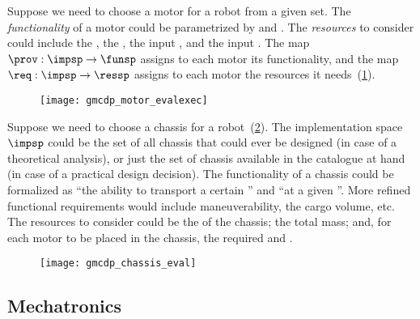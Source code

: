 \begin{example}
    \label{exa:motor}Suppose we need to choose a motor for a robot from
    a given set. The \emph{functionality} of a motor could be parametrized
    by  and . The \emph{resources} to consider
    could include the , the , the
    input , and the input .
    The map~$\prov:\impsp\rightarrow\funsp$ assigns to each motor its
    functionality, and the map~$\req:\impsp\rightarrow\ressp$ assigns
    to each motor the resources it needs~(\cref{fig:motor_evalexec}).
\end{example}

\begin{figure}[h]
    \centering
    \texttt{[image: gmcdp\_motor\_evalexec]}
    \caption{}
    \label{fig:motor_evalexec}
\end{figure}


\begin{example}
    \label{exa:chassis}Suppose we need to choose a chassis for a robot~(\cref{fig:gmcdp_chassis_eval}).
    The implementation space~$\impsp$ could be the set of all chassis
    that could ever be designed (in case of a theoretical analysis), or
    just the set of chassis available in the catalogue at hand (in case
    of a practical design decision). The functionality of a chassis could
    be formalized as ``the ability to transport a certain '' and ``at a given ''. More refined
    functional requirements would include maneuverability, the cargo volume,
    etc. The resources to consider could be the  of
    the chassis; the total mass; and, for each motor to be placed in the
    chassis, the required  and .
\end{example}
\begin{figure}[h]
    \centering
    \texttt{[image: gmcdp\_chassis\_eval]}
    \caption{}
    \label{fig:gmcdp_chassis_eval}
\end{figure}

\subsection{Mechatronics}

